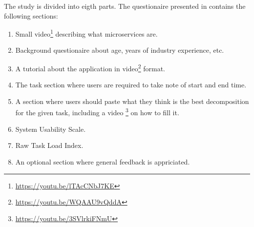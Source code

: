 The study is divided into eigth parts. The questionaire presented in
 contains the following sections:

\begin{enumerate}[1.]
  \item Small video\footnote{\url{https://youtu.be/lTAcCNbJ7KE}} describing
    what microservices are.
  \item Background questionaire about age, years of industry experience, etc.
  \item A tutorial about the application in
    video\footnote{\url{https://youtu.be/WQAAU9vQddA}} format.
  \item The task section where users are required to take note of start and end
    time. 
  \item A section where users should paste what they think is the best
    decomposition for the given task, including a video
    \footnote{\url{https://youtu.be/3SVlrkiFNmU}} on how to fill it.
  \item System Usability Scale. 
  \item Raw Task Load Index. 
  \item An optional section where general feedback is appriciated.
\end{enumerate}
